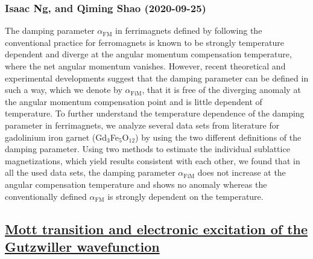 \subsubsection*{Isaac Ng, and Qiming Shao (2020-09-25)}
The damping parameter ${\alpha}_{\text{FM}}$ in ferrimagnets defined by
following the conventional practice for ferromagnets is known to be strongly
temperature dependent and diverge at the angular momentum compensation
temperature, where the net angular momentum vanishes. However, recent
theoretical and experimental developments suggest that the damping parameter
can be defined in such a way, which we denote by ${\alpha}_{\text{FiM}}$, that
it is free of the diverging anomaly at the angular momentum compensation point
and is little dependent of temperature. To further understand the temperature
dependence of the damping parameter in ferrimagnets, we analyze several data
sets from literature for gadolinium iron garnet (Gd$_3$Fe$_5$O$_{12}$) by using
the two different definitions of the damping parameter. Using two methods to
estimate the individual sublattice magnetizations, which yield results
consistent with each other, we found that in all the used data sets, the
damping parameter ${\alpha}_{\text{FiM}}$ does not increase at the angular
compensation temperature and shows no anomaly whereas the conventionally
defined ${\alpha}_{\text{FM}}$ is strongly dependent on the temperature.

\subsection*{\href{http://arxiv.org/abs/2009.12071v1}{Mott transition and electronic excitation of the Gutzwiller wavefunction}}
